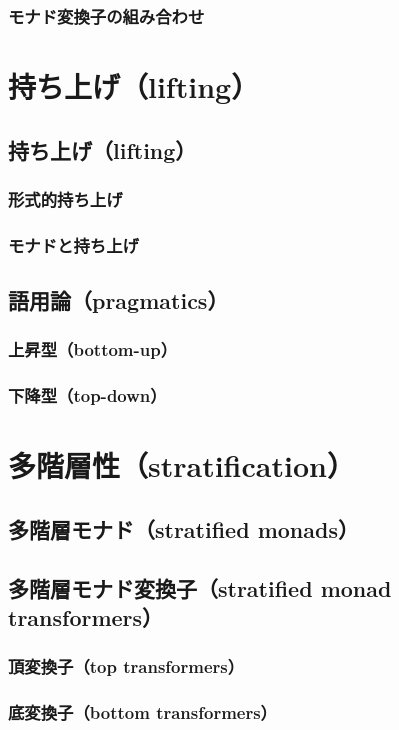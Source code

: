 \documentclass[11pt, oneside]{jsarticle}   	%
\begin{document}
\subsubsection{ モナド変換子の組み合わせ }
\section{ 持ち上げ（lifting）}
\subsection{ 持ち上げ（lifting） }
\subsubsection{  形式的持ち上げ }
\subsubsection{ モナドと持ち上げ }
\subsection{ 語用論（pragmatics） }
\subsubsection{ 上昇型（bottom-up） }
\subsubsection{ 下降型（top-down） }
\section{ 多階層性（stratification）}
\subsection{ 多階層モナド（stratified monads） }
\subsection{ 多階層モナド変換子（stratified monad transformers） }
\subsubsection{ 頂変換子（top transformers） }
\subsubsection{ 底変換子（bottom transformers） }
\end{document}
